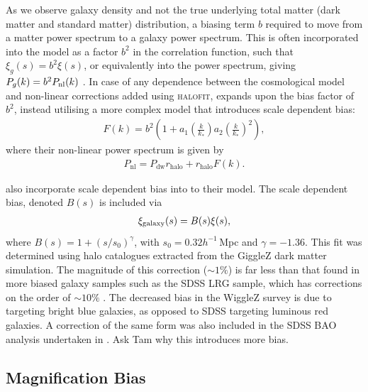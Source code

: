 \documentclass[titlesmallcaps, examinerscopy, copyrightpage]{uqthesis}
\newcommand{\red}{\color{red}}
\newcommand{\halofit}{\textsc{halofit}}
\begin{document}
As we observe galaxy density and not the true underlying total matter (dark matter and standard matter) distribution, a biasing term $b$ required to move from a matter power spectrum to a galaxy power spectrum. This is often incorporated into the model as a factor $b^2$ in the correlation function, such that $\xi_g(s) = b^2 \xi(s)$, or equivalently into the power spectrum, giving $P_g(k) = b^2 P_{\rm{nl}}(k)$ \citep{BlakeDavis2011, ChuangWang2012, XuPadmanabhan2012, AndersonAubourg2012, MontesanoSanchezPhelps2012}. In case of any dependence between the cosmological model and non-linear corrections added using \halofit{}, \citet{ReidPercival2010} expands upon the bias factor of $b^2$, instead utilising a more complex model that introduces scale dependent bias:
\begin{align}
F(k) = b^2\left(1 + a_1 \left(\frac{k}{k_*}\right) a_2 \left( \frac{k}{k_*} \right)^2 \right),
\end{align}
where their non-linear power spectrum is given by 
\begin{align}
P_{\text{nl}} = P_{\text{dw}} r_{\text{halo}} + r_{\text{halo}} F(k).
\end{align}

\citet{BlakeDavis2011} also incorporate scale dependent bias into to their model. The scale dependent bias, denoted $B(s)$ is included via
\begin{align}
\xi_{\rm{galaxy}}(s) = B(s) \xi(s),
\end{align}
where $B(s) = 1 + (s/s_0)^\gamma$, with $s_0 = 0.32 h^{-1}\,$Mpc and $\gamma = -1.36$. This fit was determined using halo catalogues extracted from the GiggleZ dark matter simulation. The magnitude of this correction ($\sim 1\%$) is far less than that found in more biased galaxy samples such as the SDSS LRG sample, which has corrections on the order of $\sim 10\%$ \citep{EisensteinZehavi2005}. The decreased bias in the WiggleZ survey is due to targeting bright blue galaxies, as opposed to SDSS targeting luminous red galaxies. A correction of the same form was also included in the SDSS BAO analysis undertaken in \citet{VeropalumboMarulliMoscardini2014}. {\red Ask Tam why this introduces more bias.}









\subsection{Magnification Bias}
\end{document}
